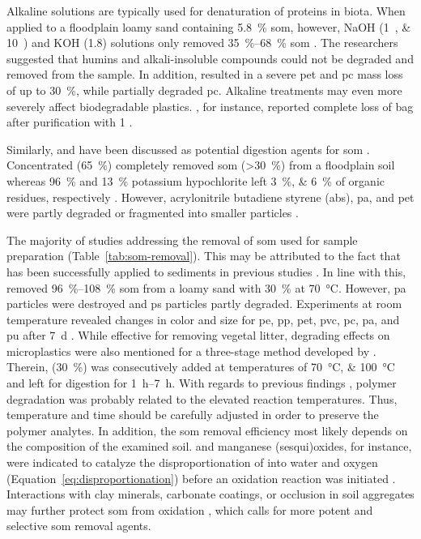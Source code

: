 Alkaline solutions are typically used for denaturation of proteins in biota. When applied to a floodplain loamy sand containing \SI{5.8}{\percent} \ac{som},
however, NaOH (\SIlist{1;10}{\Molar}) and KOH (\SI{1.8}{\Molar}) solutions only removed
\SIrange{35}{68}{\percent} \ac{som} \citep{HurleyValidation2018}. The researchers suggested that humins and alkali-insoluble compounds could not be degraded and removed from the sample. In addition,  resulted in a severe \ac{pet} and \ac{pc} mass loss of up to \SI{30}{\percent}, while  partially degraded \ac{pc}. Alkaline treatments may even more severely affect biodegradable plastics. \citet{KuhnUse2017},
for instance, reported complete loss of  bag after purification with \SI{1}{\Molar} .

Similarly,  and  have been discussed as potential digestion agents for \ac{som} \citep{BlasingPlastics2018}. Concentrated
 (\SI{65}{\percent}) completely removed \ac{som} (\SI{>30}{\percent})
from a floodplain soil whereas \SI{96}{\percent}
 and \SI{13}{\percent} potassium hypochlorite left \SIlist{3;6}{\percent} of organic residues,
respectively \citep{ScheurerMicroplastics2018}. However, acrylonitrile butadiene styrene (\ac{abs}), \ac{pa}, and \ac{pet} were partly degraded or fragmented into smaller particles \citep{ScheurerMicroplastics2018}.

The majority of studies addressing the removal of \ac{som} used
 for sample preparation
(Table~\ref{tab:som-removal}). This may be attributed to the fact that  has been successfully applied to sediments in previous studies \citep{NuelleNew2014,ImhofNovel2012}. In line with this, \citet{HurleyValidation2018}
removed \SIrange{96}{108}{\percent} \ac{som} from a loamy sand with \SI{30}{\percent}
 at \SI{70}{\degreeCelsius}. However, \ac{pa} particles were destroyed and \ac{ps} particles partly degraded. Experiments at room temperature revealed changes in color and size for \ac{pe}, \ac{pp}, \ac{pet}, \ac{pvc},
\ac{pc}, \ac{pa}, and \ac{pu} after \SI{7}{\day} \citep{NuelleNew2014}. While effective for removing vegetal litter, degrading effects on microplastics were also mentioned for a three-stage method developed by \citet{DuanDevelopment2020}.
Therein,  (\SI{30}{\percent}) was consecutively added at temperatures of \SIlist{70;100}{\degreeCelsius} and left for digestion for \SIrange{1}{7}{\hour}. With regards to previous findings \citep{HurleyValidation2018}, polymer degradation was probably related to the elevated reaction temperatures. Thus, temperature and time should be carefully adjusted in order to preserve the polymer analytes. In addition, the \ac{som} removal efficiency most likely depends on the composition of the examined soil.  and manganese (sesqui)oxides, for instance,
were indicated to catalyze the disproportionation of
 into water and oxygen (Equation~\ref{eq:disproportionation}) before an oxidation reaction was initiated \citep[Equation~\ref{eq:h2o2-oxidation}; ][]{PetigaraMechanisms2002}. Interactions with clay minerals, carbonate coatings, or occlusion in soil aggregates may further protect \ac{som} from oxidation \citep{MikuttaOrganic2005}, which calls for more potent and selective \ac{som} removal agents.

